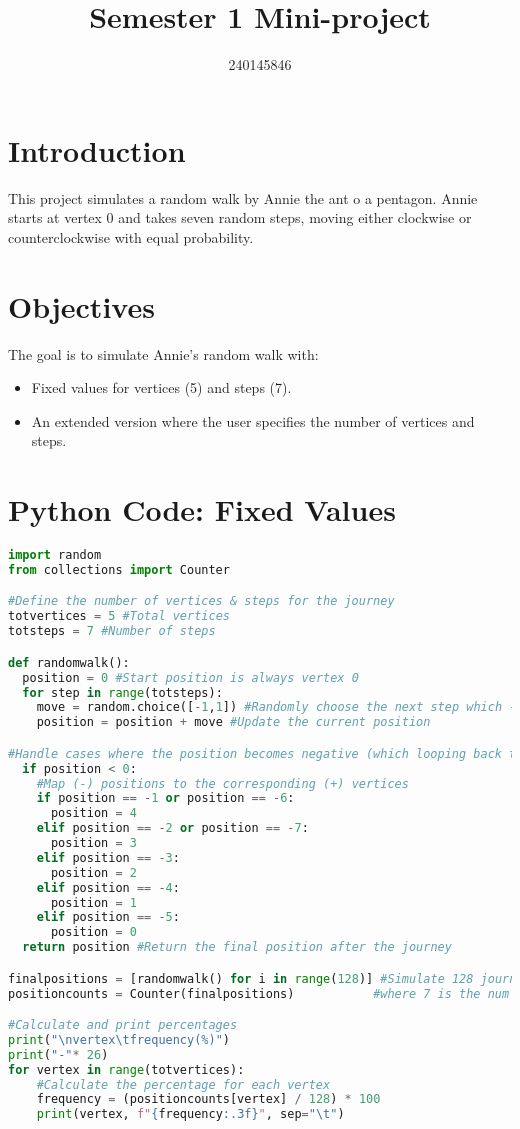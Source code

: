 \documentclass[11pt, a4paper]{amsart}
\title{Semester 1 Mini-project}
\author{240145846}
\begin{document}
\maketitle
\section{Introduction}
This project simulates a random walk by Annie the ant o a pentagon. Annie starts at vertex 0 and takes seven random steps, moving either clockwise or counterclockwise with equal probability.

\section{Objectives}
The goal is to simulate Annie's random walk with:
\begin{itemize}
  \item Fixed values for vertices (5) and steps (7).
  \item An extended version where the user specifies the number of vertices and steps.
\end{itemize}

\section{Python Code: Fixed Values}
\begin{lstlisting}[language=Python]
import random
from collections import Counter

#Define the number of vertices & steps for the journey
totvertices = 5 #Total vertices
totsteps = 7 #Number of steps

def randomwalk():
  position = 0 #Start position is always vertex 0
  for step in range(totsteps):
    move = random.choice([-1,1]) #Randomly choose the next step which -1(backward) or 1(forward)
    position = position + move #Update the current position

#Handle cases where the position becomes negative (which looping back to positive vertices)
  if position < 0:
    #Map (-) positions to the corresponding (+) vertices
    if position == -1 or position == -6:
      position = 4
    elif position == -2 or position == -7:
      position = 3
    elif position == -3:
      position = 2
    elif position == -4:
      position = 1
    elif position == -5:
      position = 0
  return position #Return the final position after the journey

finalpositions = [randomwalk() for i in range(128)] #Simulate 128 journeys (128 is chosen becuase it's 2^7, cont.
positioncounts = Counter(finalpositions)           #where 7 is the num of steps and 2 choices (backward & forward)

#Calculate and print percentages
print("\nvertex\tfrequency(%)")
print("-"* 26)
for vertex in range(totvertices):
    #Calculate the percentage for each vertex
    frequency = (positioncounts[vertex] / 128) * 100
    print(vertex, f"{frequency:.3f}", sep="\t")
\end{lstlisting}
\end{document}
